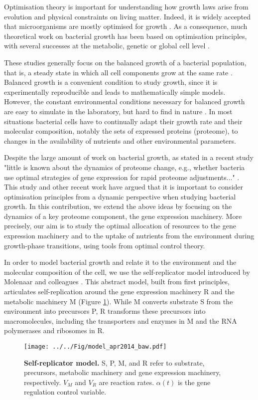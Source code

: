 \documentclass[a4paper, 10pt, conference]{ieeeconf}      %
\begin{document}
Optimisation theory is important for understanding how growth laws arise from evolution and physical constraints on living matter.
Indeed, it is widely accepted that microorganisms are mostly optimised for growth \cite{dekel_optimality_2005}.
As a consequence, much theoretical work on bacterial growth has been based on optimisation principles, with several successes at the metabolic, genetic or global cell level \cite{edwards_escherichia_2000, molenaar_shifts_2009}.

These studies generally focus on the balanced growth of a bacterial population, that is, a steady state in which all cell components grow at the same rate \cite{neidhardt_physiology_1990}.
Balanced growth is a convenient condition to study growth, since it is experimentally reproducible and leads to mathematically simple models.
However, the constant environmental conditions necessary for balanced growth are easy to simulate in the laboratory, but hard to find in nature \cite{neidhardt_physiology_1990}.
In most situations bacterial cells have to continually adapt their growth rate and their molecular composition, notably the sets of expressed proteins (proteome), to changes in the availability of nutrients and other environmental parameters.

Despite the large amount of work on bacterial growth, as stated in a recent study "little is known about the dynamics of proteome change, e.g., whether bacteria use optimal strategies of gene expression for rapid proteome adjustments..." \cite{pavlov_optimal_2013}.
This study and other recent work \cite{ehrenberg_medium-dependent_2013} have argued that it is important to consider optimisation principles from a dynamic perspective when studying bacterial growth.
In this contribution, we extend the above ideas by focusing on the dynamics of a key proteome component, the gene expression machinery.
More precisely, our aim is to study the optimal allocation of resources to the gene expression machinery and to the uptake of nutrients from the environment during growth-phase transitions, using tools from optimal control theory.

In order to model bacterial growth and relate it to the environment and the molecular composition of the cell, we use the self-replicator model introduced by Molenaar and colleagues \cite{molenaar_shifts_2009}.
This abstract model, built from first principles, articulates self-replication around the gene expression machinery R and the metabolic machinery M (Figure \ref{fig::selfrep}). While M converts substrate S from the environment into precursors P, R transforms these precursors into macromolecules, including the transporters and enzymes in M and the RNA polymerases and ribosomes in R.
\begin{figure}[htpb]
\centering
\texttt{[image: ../../Fig/model\_apr2014\_baw.pdf]}
\caption{\textbf{Self-replicator model.} S, P, M, and R refer to substrate, precursors, metabolic machinery and gene expression machinery, respectively.
$V_M$ and $V_R$ are reaction rates.
$\alpha(t)$ is the gene regulation control variable.
}
\label{fig::selfrep}
\end{figure}
\end{document}

